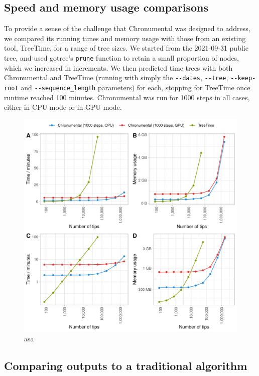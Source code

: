 \subsection*{Speed and memory usage comparisons}
To provide a sense of the challenge that Chronumental was designed to address, we compared its running times and memory usage with those from an existing tool, TreeTime, for a range of tree sizes. We started from the 2021-09-31 public tree, and used gotree's \texttt{prune} function \citep{gotree} to retain a small proportion of nodes, which we increased in increments. We then predicted time trees with both Chronumental and TreeTime (running with simply the \texttt{-{}-dates}, \texttt{-{}-tree}, \texttt{-{}-keep-root} and \texttt{-{}-sequence\_length} parameters) for each, stopping for TreeTime once runtime reached 100 minutes. Chronumental was run for 1000 steps in all cases, either in CPU mode or in GPU mode.

\begin{figure}
\centering
\includegraphics[width=0.9\linewidth]{manuscript/Figures/performance.pdf}
\caption{\label{performance} asa}

\end{figure}

\subsection*{Comparing outputs to a traditional algorithm}

